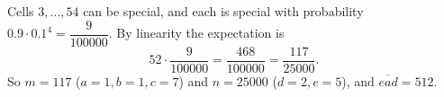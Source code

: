 Cells $3,\dots,54$ can be special, and each is special with probability $0.9\cdot0.1^4=\dfrac{9}{100000}$. By linearity the expectation is
\[52\cdot\dfrac9{100000}=\dfrac{468}{100000}=\dfrac{117}{25000}.\]
So $m=117$ ($a=1,b=1,c=7$) and $n=25000$ ($d=2,e=5$), and $\overline{ead}=\boxed{512}$.
